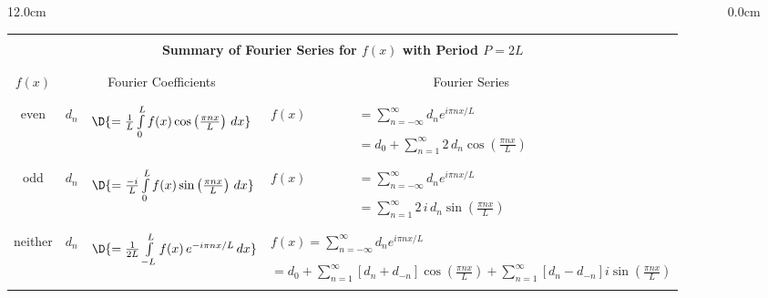 \begin{frame}
\frametitle{}
\scriptsize
\begin{columns}\begin{column}{12.0cm}
\centering
\setlength{\extrarowheight}{-0.0cm}
\begin{tabular}{|p{0.8cm}|p{-0.1cm}l|p{0.1cm}l|}
	\hline
	\hline
	\multicolumn{5}{|c|}{}\\
	\multicolumn{5}{|c|}{\bf Summary of Fourier Series for $f(x)$ with Period $P=2L$}\\
	\multicolumn{5}{|c|}{}\\
	\hline
	& & & & \\
	\multicolumn{1}{|c|}{$f(x)$} & \multicolumn{2}{c|}{Fourier Coefficients}&\multicolumn{2}{c|}{Fourier Series}\\
	& & & & \\
	\hline
	& & & & \\
	\multicolumn{1}{|c|}{\multirow{5}{*}{even}} &
	\multirow{5}{*}{$d_n$} & 
	\multirow{5}{*}{$\D{= \frac{1}{L}\int \limits_{0}^{L} f(x) \cos\left(\frac{\pi nx}{L}\right)	\,dx}$} 
	& $f(x)$ & ${= \sum \limits_{n=-\infty}^{\infty} d_n e^{i\pi nx/L} }$ \\
	& & & & \\
	& & & & ${= d_0+\sum \limits_{n=1}^{\infty} 2\,d_n \cos\left(\frac{\pi nx}{L}\right)}$ \\
	& & & & \\
	\hline
	& & & & \\
	\multicolumn{1}{|c|}{\multirow{5}{*}{odd}} &
	\multirow{5}{*}{$d_n$} & 
	\multirow{5}{*}{$\D{= \frac{-i}{L}\int \limits_{0}^{L} f(x) \sin\left(\frac{\pi nx}{L}\right)\,dx}$} 
	& $f(x)$ & ${= \sum \limits_{n=-\infty}^{\infty} d_n e^{i\pi nx/L} }$ \\
	& & & & \\
	& & & & ${= \sum \limits_{n=1}^{\infty} 2\,i\,d_n \sin\left(\frac{\pi nx}{L}\right)}$ \\
	& & & & \\
	\hline
	& & & & \\
	\multicolumn{1}{|c|}{\multirow{5}{*}{neither}} &
	\multirow{5}{*}{$d_n$} & 
	\multirow{5}{*}{$\D{= \frac{1}{2L}\int \limits_{-L}^{L} f(x)\, e^{-i\pi nx/L} \, dx}$ }
	& \multicolumn{2}{l|}{${f(x) = \sum \limits_{n=-\infty}^{\infty} d_n e^{i\pi nx/L} }$} \\
	& & & & \\
	& & & \multicolumn{2}{l|}{${= d_0 + \sum \limits_{n=1}^{\infty} [d_n+d_{-n}] \cos\left(\frac{\pi nx}{L}\right) + \sum \limits_{n=1}^{\infty} [d_n-d_{-n}]i \sin\left(\frac{\pi nx}{L}\right) }$} \\
	& & & & \\
	\hline
	\hline
\end{tabular}

\end{column}\begin{column}{0.0cm}\end{column}\end{columns}
\end{frame}

